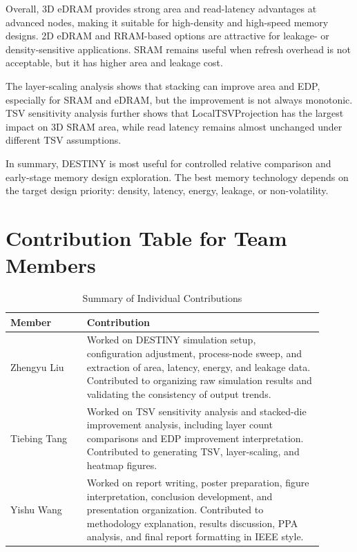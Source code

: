 \documentclass[conference]{IEEEtran}
\begin{document}
Overall, 3D eDRAM provides strong area and read-latency advantages at advanced nodes, making it suitable for high-density and high-speed memory designs. 2D eDRAM and RRAM-based options are attractive for leakage- or density-sensitive applications. SRAM remains useful when refresh overhead is not acceptable, but it has higher area and leakage cost.

The layer-scaling analysis shows that stacking can improve area and EDP, especially for SRAM and eDRAM, but the improvement is not always monotonic. TSV sensitivity analysis further shows that LocalTSVProjection has the largest impact on 3D SRAM area, while read latency remains almost unchanged under different TSV assumptions.

In summary, DESTINY is most useful for controlled relative comparison and early-stage memory design exploration. The best memory technology depends on the target design priority: density, latency, energy, leakage, or non-volatility.

\appendices

\section{Contribution Table for Team Members}

\begin{table}[htbp]
\caption{Summary of Individual Contributions}
\begin{center}
\renewcommand{\arraystretch}{1.25}
\begin{tabular}{p{0.22\linewidth} p{0.68\linewidth}}
\toprule
\textbf{Member} & \textbf{Contribution} \\
\midrule
Zhengyu Liu & 
Worked on DESTINY simulation setup, configuration adjustment, process-node sweep, and extraction of area, latency, energy, and leakage data. Contributed to organizing raw simulation results and validating the consistency of output trends. \\
\midrule
Tiebing Tang & 
Worked on TSV sensitivity analysis and stacked-die improvement analysis, including layer count comparisons and EDP improvement interpretation. Contributed to generating TSV, layer-scaling, and heatmap figures. \\
\midrule
Yishu Wang & 
Worked on report writing, poster preparation, figure interpretation, conclusion development, and presentation organization. Contributed to methodology explanation, results discussion, PPA analysis, and final report formatting in IEEE style. \\
\bottomrule
\end{tabular}
\label{tab:contribution}
\end{center}
\end{table}
\end{document}
